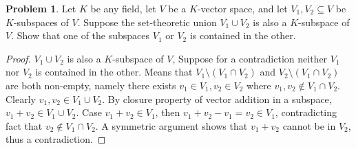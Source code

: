 \documentclass{article}
\theoremstyle{definition}
\newtheorem{problem}{Problem}
\numberwithin{equation}{problem}
\begin{document}
\begin{problem}
    Let $K$ be any field, let $V$ be a $K$-vector space,
    and let $V_1, V_2\subseteq V$ be $K$-subspaces of $V$.
    Suppose the set-theoretic union $V_1 \cup V_2$ is also a $K$-subspace of $V$.
    Show that one of the subspaces $V_1$ or $V_2$ is contained in the other.
\end{problem}
\begin{proof}
    $V_1\cup V_2$ is also a $K$-subspace of $V$,
    Suppose for a contradiction neither $V_1$ nor $V_2$ is contained in the other.
    Means that $V_1 \setminus (V_1 \cap V_2)$ and $V_2 \setminus (V_1 \cap V_2)$ are both non-empty,
    namely there exists $v_1 \in V_1, v_2 \in V_2$ where $v_1, v_2\not \in V_1 \cap V_2$.
    Clearly $v_1, v_2 \in V_1 \cup V_2$.
    By closure property of vector addition in a subspace, $v_1 + v_2 \in V_1 \cup V_2$.
    Case $v_1 + v_2 \in V_1$, then $v_1 + v_2 - v_1 = v_2 \in V_1$, contradicting fact that $v_2 \not \in V_1\cap V_2$.
    A symmetric argument shows that $v_1 + v_2$ cannot be in $V_2$, thus a contradiction.
\end{proof}
\end{document}
